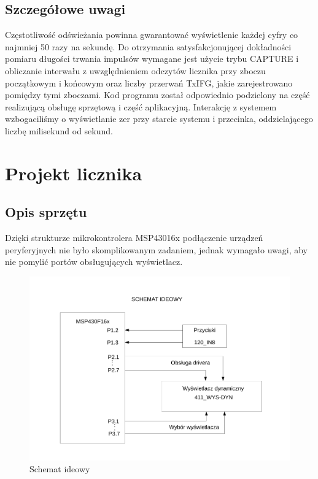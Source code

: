 \documentclass[a4paper,titlepage,11pt,floatssmall]{mwrep}
\begin{document}
\section{Szczegółowe uwagi}
\indent Częstotliwość odświeżania powinna gwarantować wyświetlenie każdej cyfry co najmniej 50 razy na sekundę. Do otrzymania satysfakcjonującej dokładności pomiaru długości trwania impulsów wymagane jest użycie trybu CAPTURE i obliczanie interwału z uwzględnieniem odczytów licznika przy zboczu początkowym i końcowym oraz liczby przerwań TxIFG, jakie zarejestrowano pomiędzy tymi zboczami. Kod programu został odpowiednio podzielony na część realizującą obsługę sprzętową i część aplikacyjną. Interakcję z systemem wzbogaciliśmy o wyświetlanie zer przy starcie systemu i przecinka, oddzielającego liczbę milisekund od sekund. 

\chapter{Projekt licznika}

\section{Opis sprzętu}
\indent{} Dzięki strukturze mikrokontrolera MSP43016x podłączenie urządzeń peryferyjnych nie było skomplikowanym zadaniem, jednak wymagało uwagi, aby nie pomylić portów obsługujących wyświetlacz. 

\begin{figure}[th]
\centering
\includegraphics[width=\textwidth]{ideowy}
\caption{Schemat ideowy}
\end{figure}
\end{document}
